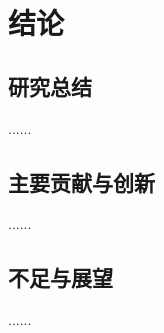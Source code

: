 
\chapter[结论]{结\quad{}论}

\section{研究总结}

......

\section{主要贡献与创新}

......

\section{不足与展望}

......
